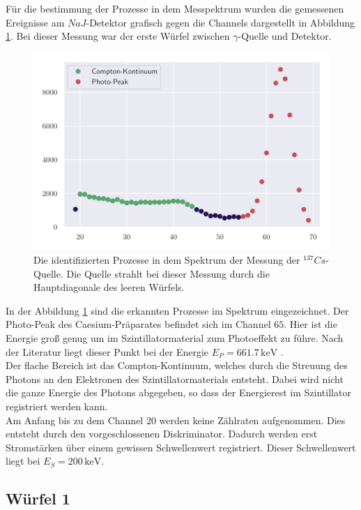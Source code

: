 Für die bestimmung der Prozesse in dem Messpektrum wurden die gemessenen Ereignisse am $NaJ$-Detektor grafisch gegen die Channels dargestellt in Abbildung \ref{fig:leer}. Bei dieser Messung war der erste Würfel zwischen $\gamma$-Quelle und Detektor. 
\begin{figure}[H]
  \centering
  \includegraphics[width = 0.9 \textwidth]{Daten/leerlauf.pdf}
  \caption{Die identifizierten Prozesse in dem Spektrum der Messung der $^{137}Cs$-Quelle. Die Quelle strahlt bei dieser Messung durch die Hauptdiagonale des leeren Würfels. }
  \label{fig:leer}
\end{figure}

In der Abbildung \ref{fig:leer} sind die erkannten Prozesse im Spektrum eingezeichnet. Der Photo-Peak des Caesium-Präparates befindet sich im Channel $65$. Hier ist die Energie groß genug um im Szintillatormaterial zum Photoeffekt zu führe. Nach der Literatur liegt dieser Punkt bei der Energie $E_P = 661.7 \,\si{\kilo\electronvolt}$ \cite{CS_Peak}. \\
Der flache Bereich ist das Compton-Kontinuum, welches durch die Streuung des Photons an den Elektronen des Szintillatormaterials entsteht. Dabei wird nicht die ganze Energie des Photons abgegeben, so dass der Energierest im Szintillator registriert werden kann. \\
Am Anfang bis zu dem Channel $20$ werden keine Zählraten aufgenommen. Dies entsteht durch den vorgeschlossenen Diskriminator. Dadurch werden erst Stromstärken über einem gewissen Schwellenwert registriert. Dieser Schwellenwert liegt bei $E_S = 200 \,\si{\kilo\electronvolt}$.
\subsection{Würfel 1}

